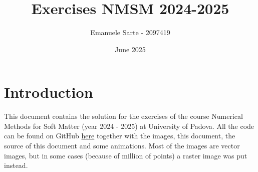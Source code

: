 \documentclass[11pt, twoside]{book}
\title{Exercises NMSM 2024-2025}
\author{Emanuele Sarte - 2097419}
\date{June 2025}
\begin{document}
\setcounter{chapter}{0}


\maketitle

\chapter{Introduction}
This document contains the solution for the exercises of the course Numerical Methods for Soft Matter (year 2024 - 2025) at University of Padova. All the code can be found on GitHub \href{https://github.com/EmanueleSarte/nmsm/tree/main}{here} together with the images, this document, the source of this document and some animations. Most of the images are vector images, but in some cases (because of million of points) a raster image was put instead.

\tableofcontents















\end{document}

